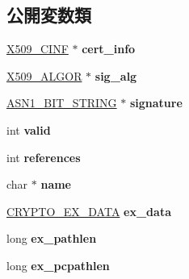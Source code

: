 \subsection*{公開変数類}
\begin{DoxyCompactItemize}
\item 
\hypertarget{structx509__st_abbae6a9fb14b3145b04b98f24128be71}{}\hyperlink{structx509__cinf__st}{X509\+\_\+\+C\+I\+N\+F} $\ast$ {\bfseries cert\+\_\+info}\label{structx509__st_abbae6a9fb14b3145b04b98f24128be71}

\item 
\hypertarget{structx509__st_a90d06c88fff740923082fa98b7b86b27}{}\hyperlink{struct_x509__algor__st}{X509\+\_\+\+A\+L\+G\+O\+R} $\ast$ {\bfseries sig\+\_\+alg}\label{structx509__st_a90d06c88fff740923082fa98b7b86b27}

\item 
\hypertarget{structx509__st_a8a1e43923e1855fb1dbfe15730cd5e7f}{}\hyperlink{structasn1__string__st}{A\+S\+N1\+\_\+\+B\+I\+T\+\_\+\+S\+T\+R\+I\+N\+G} $\ast$ {\bfseries signature}\label{structx509__st_a8a1e43923e1855fb1dbfe15730cd5e7f}

\item 
\hypertarget{structx509__st_a1e506073c0b53c10a6007f5fa9428c35}{}int {\bfseries valid}\label{structx509__st_a1e506073c0b53c10a6007f5fa9428c35}

\item 
\hypertarget{structx509__st_ab1114b325664bca1cdfd6854f247a4d5}{}int {\bfseries references}\label{structx509__st_ab1114b325664bca1cdfd6854f247a4d5}

\item 
\hypertarget{structx509__st_a447f3d7de20099a3a45fcc361a2d8f02}{}char $\ast$ {\bfseries name}\label{structx509__st_a447f3d7de20099a3a45fcc361a2d8f02}

\item 
\hypertarget{structx509__st_a388ec405fa7f267e4ce5fbcbc9ccbc91}{}\hyperlink{structcrypto__ex__data__st}{C\+R\+Y\+P\+T\+O\+\_\+\+E\+X\+\_\+\+D\+A\+T\+A} {\bfseries ex\+\_\+data}\label{structx509__st_a388ec405fa7f267e4ce5fbcbc9ccbc91}

\item 
\hypertarget{structx509__st_a9e9ea838b4395a05a70485526f05a152}{}long {\bfseries ex\+\_\+pathlen}\label{structx509__st_a9e9ea838b4395a05a70485526f05a152}

\item 
\hypertarget{structx509__st_a80c2e990274c6d80a0d2e8bc87850d59}{}long {\bfseries ex\+\_\+pcpathlen}\label{structx509__st_a80c2e990274c6d80a0d2e8bc87850d59}


\end{DoxyCompactItemize}
